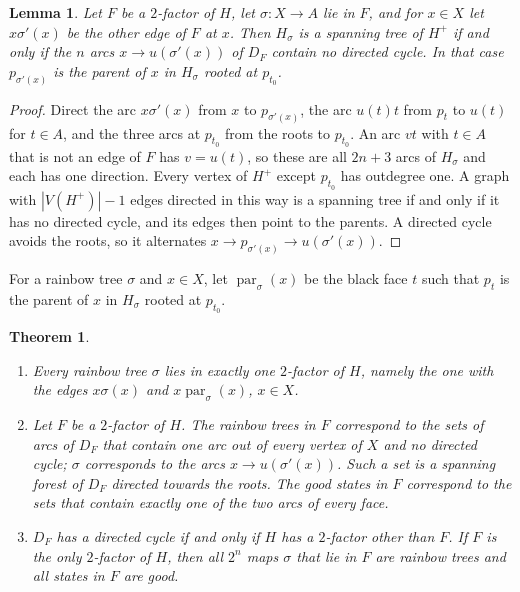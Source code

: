 \documentclass[10pt]{amsart}
\numberwithin{equation}{section}
\newtheorem{theorem}[equation]{Theorem}
\newtheorem{lemma}[equation]{Lemma}
\theoremstyle{definition}
\theoremstyle{remark}
\newcommand{\parent}{\operatorname{par}}
\newcommand{\Hp}{H^{+}}
\begin{document}
\begin{lemma}\label{lem:orient}
Let $F$ be a $2$-factor of $H$, let $\sigma\colon X\to A$ lie in $F$, and for $x\in X$ let $x\sigma'(x)$ be the other edge of $F$ at $x$.
Then $H_\sigma$ is a spanning tree of $\Hp$ if and only if the $n$ arcs $x\to u(\sigma'(x))$ of $D_F$ contain no directed cycle.
In that case $p_{\sigma'(x)}$ is the parent of $x$ in $H_\sigma$ rooted at $p_{t_0}$.
\end{lemma}

\begin{proof}
Direct the arc $x\sigma'(x)$ from $x$ to $p_{\sigma'(x)}$, the arc $u(t)t$ from $p_t$ to $u(t)$ for $t\in A$, and the three arcs at $p_{t_0}$ from the roots to $p_{t_0}$.
An arc $vt$ with $t\in A$ that is not an edge of $F$ has $v=u(t)$, so these are all $2n+3$ arcs of $H_\sigma$ and each has one direction.
Every vertex of $\Hp$ except $p_{t_0}$ has outdegree one.
A graph with $|V(\Hp)|-1$ edges directed in this way is a spanning tree if and only if it has no directed cycle, and its edges then point to the parents.
A directed cycle avoids the roots, so it alternates $x\to p_{\sigma'(x)}\to u(\sigma'(x))$.
\end{proof}

For a rainbow tree $\sigma$ and $x\in X$, let $\parent_\sigma(x)$ be the black face $t$ such that $p_t$ is the parent of $x$ in $H_\sigma$ rooted at $p_{t_0}$.

\begin{theorem}\label{thm:S}
\begin{enumerate}
\item Every rainbow tree $\sigma$ lies in exactly one $2$-factor of $H$, namely the one with the edges $x\sigma(x)$ and $x\parent_\sigma(x)$, $x\in X$.
\item Let $F$ be a $2$-factor of $H$. The rainbow trees in $F$ correspond to the sets of arcs of $D_F$ that contain one arc out of every vertex of $X$ and no directed cycle; $\sigma$ corresponds to the arcs $x\to u(\sigma'(x))$. Such a set is a spanning forest of $D_F$ directed towards the roots. The good states in $F$ correspond to the sets that contain exactly one of the two arcs of every face.
\item $D_F$ has a directed cycle if and only if $H$ has a $2$-factor other than $F$. If $F$ is the only $2$-factor of $H$, then all $2^n$ maps $\sigma$ that lie in $F$ are rainbow trees and all states in $F$ are good.
\end{enumerate}
\end{theorem}
\end{document}
